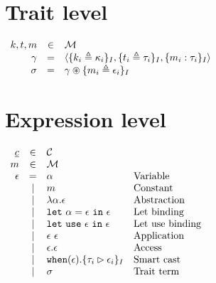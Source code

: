 \documentclass{article}[11pt]
\newcommand{\term}[1]{\verb~#1~}
\begin{document}
    \section{Trait level}\label{sec:trait-level}

    \begin{math}
        \begin{array}{rclp{5cm}}
            k, t, m & \in & {\cal M}                                                                                       \\
            \gamma  & =   & \langle \{k_i \triangleq \kappa_i\}_I, \{t_i \triangleq \tau_i\}_I, \{m_i : \tau_i\}_I \rangle \\
            \sigma  & =   & \gamma \circledast \{m_i \triangleq \epsilon_i\}_I
        \end{array}
    \end{math}


    \section{Expression level}\label{sec:expression-level}

    \begin{math}
        \begin{array}{rclp{5cm}}
            \underline{c} & \in & {\cal C} \\
            m & \in & {\cal M} \\
            \epsilon & =
            & \alpha & Variable \\
            & \mid & m                                                             & Constant        \\
            & \mid & \lambda \alpha . \epsilon                                     & Abstraction     \\
            & \mid & \term{let}~\alpha = \epsilon ~\term{in}~\epsilon              & Let~binding     \\
            & \mid & \term{let}~\term{use}~\epsilon ~\term{in}~\epsilon            & Let~use~binding \\
            & \mid & \epsilon~\epsilon                                             & Application     \\
            & \mid & \epsilon . \epsilon                                           & Access          \\
            & \mid & \term{when}(\epsilon).\{ \tau_i \rhd \epsilon_i \}_I          & Smart cast      \\
            & \mid & \sigma                                                        & Trait~term      \\
        \end{array}
    \end{math}
\end{document}
